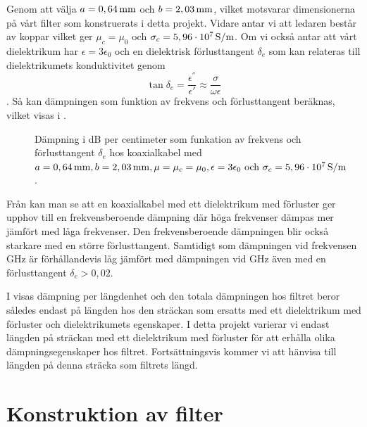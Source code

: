 \documentclass[main.tex]{subfiles}
\begin{document}
Genom att välja $a=\unit[0,64]{mm}$ och $b=\unit[2,03]{mm}$, vilket motsvarar dimensionerna på vårt filter som konstruerats i detta projekt. Vidare antar vi att ledaren består av koppar vilket ger $\mu_c=\mu_0$ och $\sigma_c=\unit[5,96\cdot 10^7]{S/m}$. Om vi också antar att vårt dielektrikum har $\epsilon=3\epsilon_0$ och en dielektrisk förlusttangent $\delta_e$ som kan relateras till dielektrikumets konduktivitet genom
\begin{equation*}
    \tan\delta_e=\frac{\epsilon^{''}}{\epsilon'}\approx\frac{\sigma}{\omega\epsilon}
\end{equation*}
\autocite{cheng}. Så kan dämpningen som funktion av frekvens och förlusttangent beräknas, vilket visas i .

\begin{figure}[H]
    
        \centering
        \setlength{}
        \setlength\figureheight{12em}
        
  \caption{Dämpning i \unit{dB} per centimeter som funkation av frekvens och förlusttangent $\delta_e$ hos koaxialkabel med $a=\unit[0,64]{mm}, b=\unit[2,03]{mm}, \mu=\mu_c=\mu_0, \epsilon=3\epsilon_0 \text{ och } \sigma_c=\unit[5,96\cdot10^7]{S/m}$.}
  \label{fig:attn_ex}
\end{figure}

Från  kan man se att en koaxialkabel med ett dielektrikum med förluster ger upphov till en frekvensberoende dämpning där höga frekvenser dämpas mer jämfört med låga frekvenser. Den frekvensberoende dämpningen blir också starkare med en större förlusttangent. Samtidigt som dämpningen vid frekvensen \unit[0-8]{GHz} är förhållandevis låg jämfört med dämpningen vid \unit[50]{GHz} även med en förlusttangent $\delta_e>0,02$.

I  visas dämpning per längdenhet och den totala dämpningen hos filtret beror således endast på längden hos den sträckan som ersatts med ett dielektrikum med förluster och dielektrikumets egenskaper. I detta projekt varierar vi endast längden på sträckan med ett dielektrikum med förluster för att erhålla olika dämpningsegenskaper hos filtret. Fortsättningsvis kommer vi att hänvisa till längden på denna sträcka som filtrets längd. 





\section{Konstruktion av filter}
\end{document}
